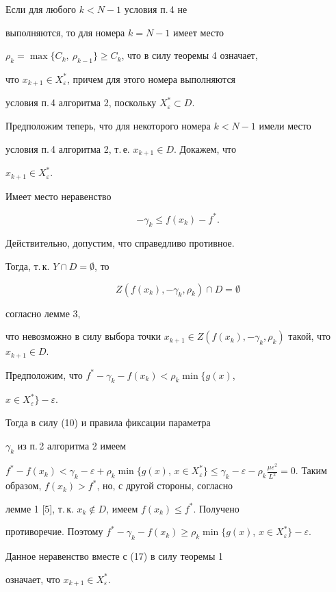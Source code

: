 \begin{pf}


Если для любого $k<N-1$ условия п.\,4 не


выполняются, то для номера $k=N-1$ имеет место


$\rho_k=\max\{C_k,\ \rho_{k-1}\}\ge C_k$, что в силу теоремы 4 означает,


что $x_{k+1}\in X_{\varepsilon}^*$, причем для этого номера выполняются


условия п.\,4 алгоритма 2, поскольку $X_{\varepsilon}^*\subset D$. 





Предположим теперь, что для некоторого номера $k<N-1$ имели место


условия п.\,4 алгоритма 2, т.\,е. $x_{k+1}\in D$. Докажем, что


$x_{k+1}\in X_{\varepsilon}^*$. 





Имеет место неравенство 


\begin{equation}


-\gamma_k\le f(x_k)-f^*.


\end{equation}


Действительно, допустим, что справедливо противное.


Тогда, т.\,к. $Y\cap D=\emptyset$, то


$$


Z(f(x_k),-\gamma_k,\rho_k)\cap D=\emptyset


$$


согласно лемме 3,


что невозможно в силу выбора точки $x_{k+1}\in


Z(f(x_k),-\gamma_k,\rho_k)$ такой, что $x_{k+1}\in D$.





Предположим, что $f^*-\gamma_k-f(x_k)<\rho_k\min\{g(x)$,


$x\in X_{\varepsilon}^*\}-\varepsilon$.


Тогда в силу (10) и правила фиксации параметра


$\gamma_k$ из п.\,2 алгоритма 2 имеем


$f^*-f(x_k)<\gamma_k-\varepsilon+\rho_k\min\{g(x)$, $x\in


X_{\varepsilon}^*\}\le\gamma_k-\varepsilon-\rho_k\frac{\mu\varepsilon^2}


{L^2}=0$. Таким образом, $f(x_k)>f^*$, но, с другой стороны, согласно


лемме 1 [5], т.\,к. $x_k\notin D$, имеем $f(x_k)\le f^*$. Получено


противоречие. Поэтому $f^*-\gamma_k-f(x_k)\ge


\rho_k\min\{g(x)$, $x\in X_{\varepsilon}^*\}-\varepsilon$.


Данное неравенство вместе с (17) в силу теоремы 1 


означает, что $x_{k+1}\in X_{\varepsilon}^*$.


\end{pf}





